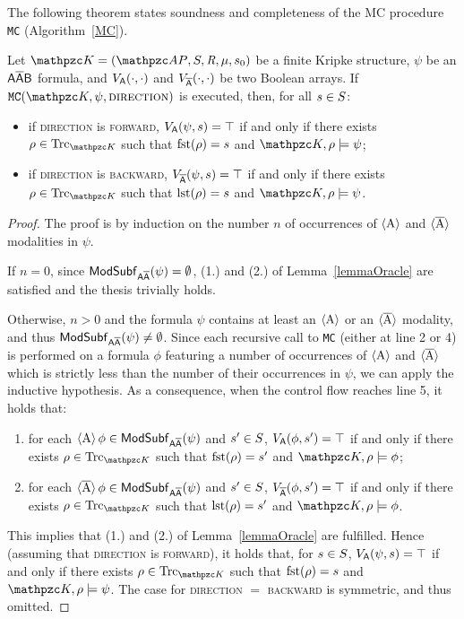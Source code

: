 The following theorem states soundness and completeness of the MC procedure \texttt{MC} (Algorithm~\ref{MC}).
%
\begin{theorem}\label{MCsoundCompl}
Let $\Ku=\KuDef$ be a finite Kripke structure, $\psi$ be an $\mathsf{A\overline{A}B}$ formula, and $V_{\mathsf{A}}(\cdot,\cdot)$ and $V_{\mathsf{\overline{A}}}(\cdot,\cdot)$ be two Boolean arrays. If $\texttt{MC}(\Ku,\psi,\textsc{direction})$ is executed, then, for all $s\in S$:
\begin{itemize}
	\item if \textsc{direction} is \textsc{forward}, $V_{\mathsf{A}}(\psi,s)=\top$ if and only if there exists $\rho\in\Trk_{\Ku}$ such that $\operatorname{fst}(\rho)=s$ and $\Ku,\rho\models \psi$;
	\item if \textsc{direction} is \textsc{backward}, $V_{\mathsf{\overline{A}}}(\psi,s)=\top$ if and only if there exists $\rho\in\Trk_{\Ku}$ such that $\operatorname{lst}(\rho)=s$ and $\Ku,\rho\models\psi$.
\end{itemize}
\end{theorem}
%
\begin{proof}
The proof is by induction on the number $n$ of occurrences of $\operatorname{\langle A\rangle}$ and $\operatorname{\langle \overline{A}\rangle}$ modalities in $\psi$.

If $n=0$, since $\mathsf{ModSubf}_{\mathsf{A\overline{A}}}(\psi)=\emptyset$, (1.) and (2.) of Lemma~\ref{lemmaOracle} are satisfied and the thesis trivially holds.

Otherwise, $n>0$ and the formula $\psi$ contains at least an $\operatorname{\langle A\rangle}$ or an $\operatorname{\langle \overline{A}\rangle}$ modality, and thus $\mathsf{ModSubf}_{\mathsf{A\overline{A}}}(\psi)\allowbreak \neq \emptyset$. Since each recursive call to \texttt{MC} (either at line 2 or 4) is performed on a formula $\phi$ featuring a number of occurrences of $\operatorname{\langle A\rangle}$ and $\operatorname{\langle \overline{A}\rangle}$ which is strictly less than the number of their occurrences in $\psi$, we can apply the inductive hypothesis. As a consequence, when the control flow reaches line 5, it holds that:
\begin{enumerate}
	\item for each $\operatorname{\langle A\rangle} \phi\in\mathsf{ModSubf}_{\mathsf{A\overline{A}}}(\psi)$ and $s'\in S$, $V_{\mathsf{A}}(\phi,s')=\top$ if and only if there exists $\rho\in\Trk_{\Ku}$ such that $\operatorname{fst}(\rho)=s'$ and $\Ku,\rho\models \phi$;
	\item for each $\operatorname{\langle \overline{A}\rangle} \phi\in\mathsf{ModSubf}_{\mathsf{A\overline{A}}}(\psi)$ and $s'\in S$, $V_{\mathsf{\overline{A}}}(\phi,s')=\top$ if and only if there exists $\rho\in\Trk_{\Ku}$ such that $\operatorname{lst}(\rho)=s'$ and $\Ku,\rho\models \phi$.
\end{enumerate}
This implies that (1.) and (2.) of Lemma~\ref{lemmaOracle} are fulfilled. Hence (assuming that \textsc{direction} is \textsc{forward}), it holds that, for $s\in S$, $V_{\mathsf{A}}(\psi,s)=\top$ if and only if there exists $\rho\in\Trk_{\Ku}$ such that $\operatorname{fst}(\rho)=s$ and $\Ku,\rho\models \psi$. The case for  \textsc{direction} $=$  \textsc{backward} is symmetric, and thus omitted.
\end{proof}

